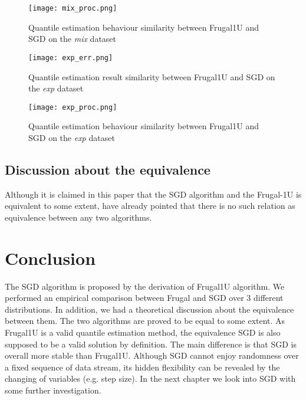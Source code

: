 \begin{figure}[h!]
    \centering
	\texttt{[image: mix\_proc.png]}
    \caption{Quantile estimation behaviour similarity between Frugal1U and SGD on the \textit{mix} dataset}
    \label{fig: mix_proc}
\end{figure}

\begin{figure}[h!]
    \centering
	\texttt{[image: exp\_err.png]}
    \caption{Quantile estimation result similarity between Frugal1U and SGD on the \textit{exp} dataset}
    \label{fig: exp_err}
\end{figure}

\begin{figure}[h!]
    \centering
	\texttt{[image: exp\_proc.png]}
    \caption{Quantile estimation behaviour similarity between Frugal1U and SGD on the \textit{exp} dataset}
    \label{fig: exp_proc}
\end{figure}

\subsection{Discussion about the equivalence}
Although it is claimed in this paper that the SGD algorithm and the Frugal-1U is equivalent to some extent, \citeauthor{blassWhenAreTwo2008}\cite{blassWhenAreTwo2008} have already pointed that there is no such relation as equivalence between any two algorithms. 

\section{Conclusion}
The SGD algorithm is proposed by the derivation of Frugal1U algorithm. We performed an empirical comparison between Frugal and SGD over 3 different distributions. In addition, we had a theoretical discussion about the equivalence between them. The two algorithms are proved to be equal to some extent. As Frugal1U is a valid quantile estimation method, the equivalence SGD is also supposed to be a valid solution by definition.
The main difference is that SGD is overall more stable than Frugal1U.
Although SGD cannot enjoy randomness over a fixed sequence of data stream, its hidden flexibility can be revealed by the changing of variables (e.g. step size).
In the next chapter we look into SGD with some further investigation.